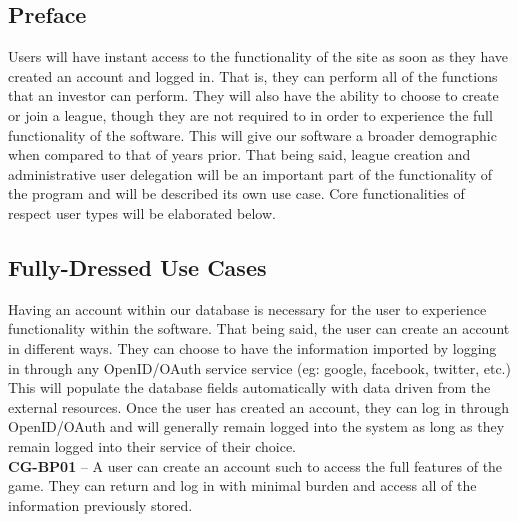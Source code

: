 \label{useCases}

\subsection{Preface}

Users will have instant access to the functionality of the site as soon as they
have created an account and logged in. That is, they can perform all of the functions
that an investor can perform. They will also have the ability to choose to create or
join a league, though they are not required to in order to experience the full
functionality of the software. This will give our software a broader demographic
when compared to that of years prior. That being said, league creation and
administrative user delegation will be an important part of the functionality of
the program and will be described its own use case. Core functionalities of respect
user types will be elaborated below.\\

\subsection{Fully-Dressed Use Cases}

Having an account within our database is necessary for the user to experience
functionality within the software. That being said, the user can create an account in
different ways. They can choose to have the information imported by logging in through
any OpenID/OAuth service service (eg: google, facebook, twitter, etc.) This will populate
the database fields automatically with data driven from the external resources.
Once the user has created an account, they can log in through OpenID/OAuth and will
generally remain logged into the system as long as they remain logged into their service
of their choice.\\

\textbf{CG-BP01} – A user can create an account such to access the full features of the game.
They can return and log in with minimal burden and access all of the information previously
stored. \\

